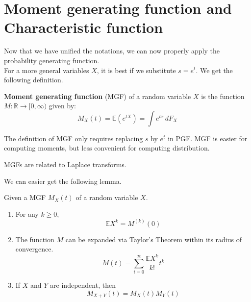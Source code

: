 \documentclass{huhtakm-template-book}
\newcommand{\expect}{\mathbb{E}}
\begin{document}
\section{Moment generating function and Characteristic function}
    Now that we have unified the notations, we can now properly apply the probability generating function.\\
    For a more general variables $X$, it is best if we substitute $s=e^{t}$. We get the following definition.
    \begin{defn}
        \textbf{Moment generating function} (MGF) of a random variable $X$ is the function $M:\mathbb{R}\to[0,\infty)$ given by:
        \begin{equation*}
            M_{X}(t)=\expect(e^{tX})=\int e^{tx}\,dF_{X}
        \end{equation*}
    \end{defn}
    \begin{rem}
        The definition of MGF only requires replacing $s$ by $e^{t}$ in PGF. MGF is easier for computing moments, but less convenient for computing distribution.
    \end{rem}
    \begin{rem}
        MGFs are related to Laplace transforms.
    \end{rem}
    We can easier get the following lemma.
    \begin{lem}
        Given a MGF $M_{X}(t)$ of a random variable $X$. 
        \begin{enumerate}
            \item For any $k\geq 0$,
            \begin{equation*}
                \expect X^{k}=M^{(k)}(0)
            \end{equation*}
            \item The function $M$ can be expanded via Taylor's Theorem within its radius of convergence.
            \begin{equation*}
                M(t)=\sum_{i=0}^{\infty}\frac{\expect X^{k}}{k!}t^{k}
            \end{equation*}
            \item If $X$ and $Y$ are independent, then
            \begin{equation*}
                M_{X+Y}(t)=M_{X}(t)M_{Y}(t)
            \end{equation*}
        \end{enumerate}
    \end{lem}
\end{document}
